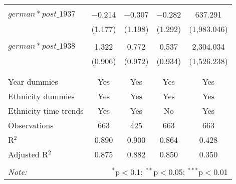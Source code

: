 \begin{table}[!htbp]
\begin{tabular}{@{\extracolsep{5pt}}lcccc}
  & & & & \\ 
 $german*post\_1937$ & $-$0.214 & $-$0.307 & $-$0.282 & 637.291 \\ 
  & (1.177) & (1.198) & (1.292) & (1,983.046) \\ 
  & & & & \\ 
 $german*post\_1938$ & 1.322 & 0.772 & 0.537 & 2,304.034 \\ 
  & (0.906) & (0.972) & (0.934) & (1,526.238) \\ 
  & & & & \\ 
\hline \\[-1.8ex] 
Year dummies & Yes & Yes & Yes & Yes \\ 
Ethnicity dummies & Yes & Yes & Yes & Yes \\ 
Ethnicity time trends & Yes & Yes & No & Yes \\ 
Observations & 663 & 425 & 663 & 663 \\ 
R$^{2}$ & 0.890 & 0.900 & 0.864 & 0.428 \\ 
Adjusted R$^{2}$ & 0.875 & 0.882 & 0.850 & 0.350 \\ 
\hline 
\hline \\[-1.8ex] 
\textit{Note:}  & \multicolumn{4}{r}{$^{*}$p$<$0.1; $^{**}$p$<$0.05; $^{***}$p$<$0.01} \\ 
\end{tabular} 
\end{table} 
